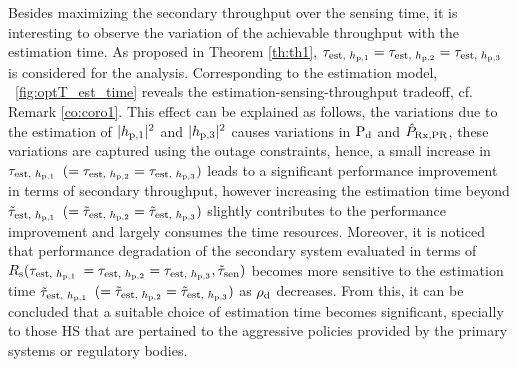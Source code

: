 Besides maximizing the secondary throughput over the sensing time, it is interesting to observe the variation of the achievable throughput with the estimation time.
As proposed in Theorem \ref{th:th1}, $\tau_{\text{est, $h_{\text{p,1}}$}} = \tau_{\text{est, $h_{\text{p,2}}$}} = \tau_{\text{est, $h_{\text{p,3}}$}}$ is considered for the analysis. Corresponding to the estimation model, \figurename~\ref{fig:optT_est_time} reveals the estimation-sensing-throughput tradeoff, cf. Remark \ref{co:coro1}. This effect can be explained as follows, the variations due to the estimation of $|h_{\text{p,1}}|^2$ and $|h_{\text{p,3}}|^2$ causes variations in $\text{P}_{\text{d}}$ and $\hat{P}_{\text{Rx,PR}}$, these variations are captured using the outage constraints, hence, a small increase in $\tau_{\text{est, $h_{\text{p,1}}$}}$ $(= \tau_{\text{est, $h_{\text{p,2}}$}} = \tau_{\text{est, $h_{\text{p,3}}$}})$ leads to a significant performance improvement in terms of secondary throughput, however increasing the estimation time beyond $\tilde{\tau}_{\text{est, $h_{\text{p,1}}$}}$ $(= \tilde{\tau}_{\text{est, $h_{\text{p,2}}$}}= \tilde{\tau}_{\text{est, $h_{\text{p,3}}$}})$ slightly contributes to the performance improvement and largely consumes the time resources. Moreover, it is noticed that performance degradation of the secondary system evaluated in terms of $R_{\text{s}}(\tau_{\text{est, $h_{\text{p,1}}$}}$ $= \tau_{\text{est, $h_{\text{p,2}}$}} = \tau_{\text{est, $h_{\text{p,3}}$}}, \tilde{\tau}_{\text{sen}})$ becomes more sensitive to the estimation time $\tilde{\tau}_{\text{est, $h_{\text{p,1}}$}}$ $(= \tilde{\tau}_{\text{est, $h_{\text{p,2}}$}}= \tilde{\tau}_{\text{est, $h_{\text{p,3}}$}})$ as $\rho_{\text{d}}$ decreases. From this, it can be concluded that a suitable choice of estimation time becomes significant, specially to those HS that are pertained to the aggressive policies provided by the primary systems or regulatory bodies. 


